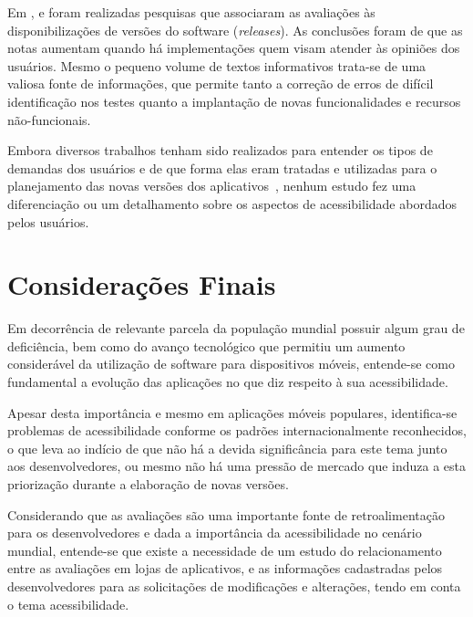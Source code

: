 Em \cite{Palomba2015userreviews}, \cite{Palompa2018crowdsourcing} e \cite{Li2018MobileAE} foram realizadas pesquisas que associaram as avaliações às disponibilizações de versões do software (\textit{releases}). As conclusões foram de que as notas aumentam quando há implementações quem visam atender às opiniões dos usuários. Mesmo o pequeno volume de textos informativos trata-se de uma valiosa fonte de informações, que permite tanto a correção de erros de difícil identificação nos testes quanto a implantação de novas funcionalidades e recursos não-funcionais.

Embora diversos trabalhos tenham sido realizados para entender os tipos de demandas dos usuários e de que forma elas eram tratadas e utilizadas para o planejamento das novas versões dos aplicativos~\cite{Iacob2013retrieving,Pagano2013userfeedback,Iacob2014online,Mcilroy2016analyzing,Sorbo2017surf,Ciurumelea2017analyzing,Ortega2015thesis,Li2018MobileAE,Pelloni2018becloma,Panichella2015how}, nenhum estudo fez uma diferenciação ou um detalhamento sobre os aspectos de acessibilidade abordados pelos usuários. 



\section{Considerações Finais}
Em decorrência de relevante parcela da população mundial possuir algum grau de deficiência, bem como do avanço tecnológico que permitiu um aumento considerável da utilização de software para dispositivos móveis, entende-se como fundamental a evolução das aplicações no que diz respeito à sua acessibilidade.

Apesar desta importância e mesmo em aplicações móveis populares, identifica-se problemas de acessibilidade conforme os padrões internacionalmente reconhecidos, o que leva ao indício de que não há a devida significância para este tema junto aos desenvolvedores, ou mesmo não há uma pressão de mercado que induza a esta priorização durante a elaboração de novas versões.

Considerando que as avaliações são uma importante fonte de retroalimentação para os desenvolvedores e dada a importância da acessibilidade no cenário mundial, entende-se que existe a necessidade de um estudo do relacionamento entre as avaliações em lojas de aplicativos, e as informações cadastradas pelos desenvolvedores para as solicitações de modificações e alterações, tendo em conta o tema acessibilidade.
